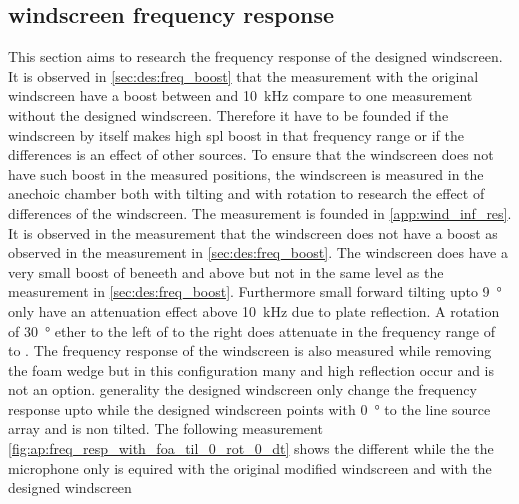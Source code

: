 \subsection{windscreen frequency response}\label{sec:ds:wind_freq_res}
This section aims to research the frequency response of the designed windscreen. It is observed in \autoref{sec:des:freq_boost} that the measurement with the original windscreen have a boost between  and \SI{10}{\kilo\hertz} compare to one measurement without the designed windscreen. Therefore it have to be founded if the windscreen by itself makes high \gls{spl} boost in that frequency range or if the differences is an effect of other sources. To ensure that the windscreen does not have such boost in the measured positions, the windscreen is measured in the anechoic chamber both with tilting and with rotation to research the effect of differences of the windscreen. The measurement is founded in \autoref{app:wind_inf_res}. It is observed in the measurement that the windscreen does not have a boost as observed in the measurement in \autoref{sec:des:freq_boost}. The windscreen does have a very small boost of  beneeth  and above  but not in the same level as the measurement in \autoref{sec:des:freq_boost}. Furthermore small forward tilting upto \SI{9}{\degree} only have an attenuation effect above \SI{10}{\kilo\hertz} due to plate reflection. A rotation of \SI{30}{\degree} ether to the left of to the right does attenuate in the frequency range of  to . The frequency response of the windscreen is also measured while removing the foam wedge but in this configuration many and high reflection occur and is not an option. generality the designed windscreen only change the frequency response upto  while the designed windscreen points with \SI{0}{\degree} to the line source array and is non tilted. The following measurement \autoref{fig:ap:freq_resp_with_foa_til_0_rot_0_dt} shows the different while the the microphone only is equired with the original modified windscreen and with the designed windscreen



